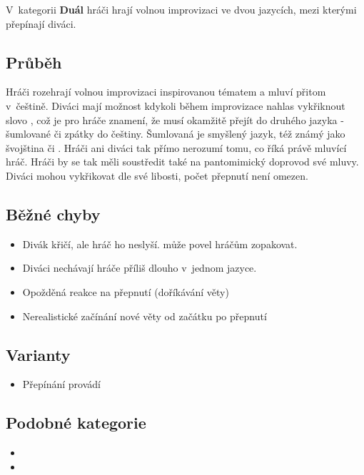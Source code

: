 V~kategorii \textbf{Duál} hráči hrají volnou improvizaci ve dvou jazycích, mezi kterými přepínají diváci. 
 
\subsection{Průběh} Hráči rozehrají volnou improvizaci inspirovanou tématem a mluví přitom v~češtině. Diváci mají možnost kdykoli během improvizace nahlas vykřiknout slovo  , což je pro hráče znamení, že musí okamžitě přejít do druhého jazyka - šumlované či zpátky do češtiny. Šumlovaná je smyšlený jazyk, též známý jako švojština či . Hráči ani diváci tak přímo nerozumí tomu, co říká právě mluvící hráč. Hráči by se tak měli soustředit také na pantomimický doprovod své mluvy. Diváci mohou vykřikovat dle své libosti, počet přepnutí není omezen.  
 
\subsection{Běžné chyby} \begin{itemize}
\item Divák křičí, ale hráč ho neslyší.  může povel hráčům zopakovat.
\item Diváci nechávají hráče příliš dlouho v~jednom jazyce.
\item Opožděná reakce na přepnutí (doříkávání věty)
\item Nerealistické začínání nové věty od začátku po přepnutí
\end{itemize}
 
\subsection{Varianty} \begin{itemize}
\item Přepínání provádí 
\end{itemize}
 
\subsection{Podobné kategorie} \begin{itemize}
\item  {}
\item  {}
\end{itemize}
 

